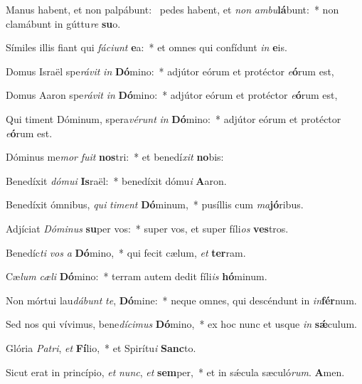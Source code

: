\item Manus habent, et non palpábunt:~\pscross{} pedes habent, et \textit{non} \textit{ambu}\textbf{lá}bunt:~* non clamábunt in gúttu\textit{re} \textbf{su}o.

\item Símiles illis fiant qui \textit{fáciunt} \textbf{e}a:~* et omnes qui confídunt \textit{in} \textbf{e}is.

\item Domus Israël spe\textit{rávit} \textit{in} \textbf{Dó}mino:~* adjútor eórum et protéctor \textit{e}\textbf{ó}rum est,

\item Domus Aaron spe\textit{rávit} \textit{in} \textbf{Dó}mino:~* adjútor eórum et protéctor \textit{e}\textbf{ó}rum est,

\item Qui timent Dóminum, spera\textit{vérunt} \textit{in} \textbf{Dó}mino:~* adjútor eórum et protéctor \textit{e}\textbf{ó}rum est.

\item Dóminus me\textit{mor} \textit{fuit} \textbf{nos}tri:~* et benedí\textit{xit} \textbf{no}bis:

\item Benedíxit \textit{dómui} \textbf{Is}raël:~* benedíxit dómu\textit{i} \textbf{A}aron.

\item Benedíxit ómnibus, \textit{qui} \textit{timent} \textbf{Dó}minum,~* pusíllis cum \textit{ma}\textbf{jó}ribus.

\item Adjíciat \textit{Dóminus} \textbf{su}per vos:~* super vos, et super fíli\textit{os} \textbf{ves}tros.

\item Benedíc\textit{ti} \textit{vos} \textit{a} \textbf{Dó}mino,~* qui fecit cælum, \textit{et} \textbf{ter}ram.

\item Cæ\textit{lum} \textit{cæli} \textbf{Dó}mino:~* terram autem dedit fíli\textit{is} \textbf{hó}minum.

\item Non mórtui lau\textit{dábunt} \textit{te}, \textbf{Dó}mine:~* neque omnes, qui descéndunt in \textit{in}\textbf{fér}num.

\item Sed nos qui vívimus, bene\textit{dícimus} \textbf{Dó}mino,~* ex hoc nunc et usque \textit{in} \textbf{sǽ}culum.

\item Glória \textit{Patri}, \textit{et} \textbf{Fí}lio,~* et Spirítu\textit{i} \textbf{Sanc}to.

\item Sicut erat in princípio, \textit{et} \textit{nunc}, \textit{et} \textbf{sem}per,~* et in sǽcula sæculó\textit{rum}. \textbf{A}men.
